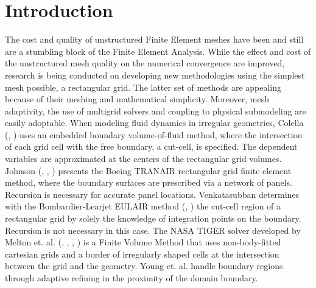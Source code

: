 \documentclass[12pt,twoside]{article}
\begin{document}
\section{Introduction}\label{sec:intro}
\par The cost and quality of unstructured Finite Element meshes have been and still are a stumbling block of the Finite Element Analysis. While the effect and cost of the unstructured mesh quality on the numerical convergence are improved, research is being conducted on developing new methodologies using the simplest mesh possible, a rectangular grid. The latter set of methods are appealing because of their meshing and mathematical simplicity. Moreover, mesh adaptivity, the use of multigrid solvers and coupling to physical submodeling are easily adoptable.  When modeling fluid dynamics in irregular geometries, Colella (\cite{colella2}, \cite{colella})  uses an embedded boundary volume-of-fluid method, where the intersection of each grid cell with the free boundary, a cut-cell, is specified. The dependent variables are approximated at the centers of the rectangular grid volumes. Johnson (\cite{tranair}, \cite{tranair2}, \cite{tranair3}) presents the Boeing TRANAIR rectangular grid finite element method, where the boundary surfaces are prescribed via a network of panels.  Recursion is necessary for accurate panel locations. Venkatasubban determines with the Bombardier-Learjet EULAIR method (\cite{eulair}, \cite{eulair2}) the cut-cell region of a rectangular grid by solely the knowledge of integration points on the boundary. Recursion is not necessary in this case. The NASA TIGER solver developed by Melton et. al. (\cite{tiger}, \cite{tiger2}, \cite{tiger3}, \cite{tiger4}) is a Finite Volume Method that uses non-body-fitted cartesian grids and a border of irregularly shaped  cells at the intersection between the grid and the geometry.  Young et. al. \cite{young} handle boundary regions through adaptive refining in the proximity of the domain boundary.  
\end{document}
